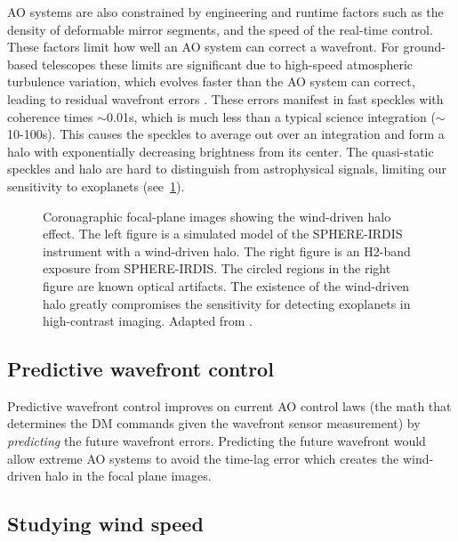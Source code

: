 AO systems are also constrained by engineering and runtime factors such as the density of deformable mirror segments, and the speed of the real-time control. These factors limit how well an AO system can correct a wavefront. For ground-based telescopes these limits are significant due to high-speed atmospheric turbulence variation, which evolves faster than the AO system can correct, leading to residual wavefront errors \citep{Soummer_2007}. These errors manifest in fast speckles with coherence times $\sim$0.01s, which is much less than a typical science integration ($\sim$10-100s). This causes the speckles to average out over an integration and form a halo with exponentially decreasing brightness from its center. The quasi-static speckles and halo are hard to distinguish from astrophysical signals, limiting our sensitivity to exoplanets (see~\ref{fig:wdh}).

\begin{figure}
    \centering
    \caption{Coronagraphic focal-plane images showing the wind-driven halo effect. The left figure is a simulated model of the SPHERE-IRDIS instrument with a wind-driven halo. The right figure is an H2-band exposure from SPHERE-IRDIS. The circled regions in the right figure are known optical artifacts. The existence of the wind-driven halo greatly compromises the sensitivity for detecting exoplanets in high-contrast imaging. Adapted from \cite{2020AA...638A..98C}.}
    \label{fig:wdh}
\end{figure}

\subsection{Predictive wavefront control} \label{sec:pwfc}

Predictive wavefront control improves on current AO control laws (the math that determines the DM commands given the wavefront sensor measurement) by \textit{predicting} the future wavefront errors. Predicting the future wavefront would allow extreme AO systems to avoid the time-lag error which creates the wind-driven halo in the focal plane images.  

\subsection{Studying wind speed} \label{sec:windspeed}

